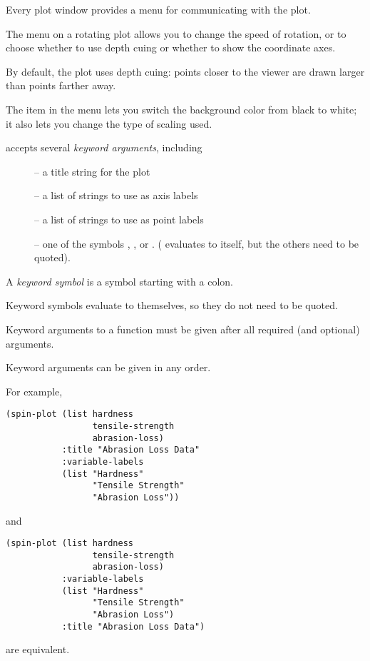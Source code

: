 \begin{slide}{}
Every plot window provides a menu for
communicating with the plot.

The menu on a rotating plot allows you to change the speed of
rotation, or to choose whether to use depth cuing
or whether to show the coordinate axes.

By default, the plot uses depth cuing: points closer to the viewer are
drawn larger than points farther away.

The  item in the menu lets you switch the background
color from black to white; it also lets you change the type of scaling
used.
\end{slide}

\begin{slide}{}
 accepts several {\em keyword arguments}, including
\begin{description}
\item[]
 -- a title string for the plot
\item[]
 -- a list of strings to use as axis labels
\item[]
 -- a list of strings to use as point labels
\item[]
 -- one of the symbols , ,
or . ( evaluates to itself, but the others need
to be quoted).
\end{description}
A {\em keyword symbol}\/ is a symbol starting with a colon.

Keyword symbols evaluate to themselves, so they do not need to be
quoted.

Keyword arguments to a function must be given after all required (and
optional) arguments.

Keyword arguments can be given in any order.
\end{slide}

\begin{slide}{}
For example,
{\Large
\begin{verbatim}
(spin-plot (list hardness
                 tensile-strength
                 abrasion-loss)
           :title "Abrasion Loss Data"
           :variable-labels
           (list "Hardness"
                 "Tensile Strength"
                 "Abrasion Loss"))
\end{verbatim}}
and
{\Large
\begin{verbatim}
(spin-plot (list hardness
                 tensile-strength
                 abrasion-loss)
           :variable-labels
           (list "Hardness"
                 "Tensile Strength"
                 "Abrasion Loss")
           :title "Abrasion Loss Data")
\end{verbatim}}
are equivalent.
\end{slide}

